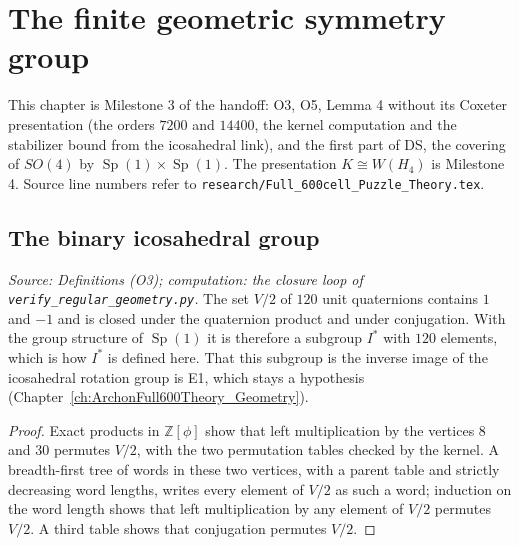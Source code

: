 \chapter{The finite geometric symmetry group}
\label{ch:ArchonFull600Theory_Symmetry}

This chapter is Milestone 3 of the handoff: O3, O5, Lemma 4 without its
Coxeter presentation (the orders \(7200\) and \(14400\), the kernel
computation and the stabilizer bound from the icosahedral link), and the
first part of DS, the covering of \(SO(4)\) by
\(\operatorname{Sp}(1)\times\operatorname{Sp}(1)\). The presentation
\(K\cong W(H_4)\) is Milestone 4. Source line numbers refer to
\texttt{research/Full\_600cell\_Puzzle\_Theory.tex}.

\section{The binary icosahedral group}

\begin{theorem}
  \label{thm:binary-icosahedral}
  \leanok
  \textit{Source: Definitions (O3); computation: the closure loop of
  \texttt{verify\_regular\_geometry.py}.}
  The set \(V/2\) of \(120\) unit quaternions contains \(1\) and \(-1\) and
  is closed under the quaternion product and under conjugation. With the
  group structure of \(\operatorname{Sp}(1)\) it is therefore a subgroup
  \(I^*\) with \(120\) elements, which is how \(I^*\) is defined here.
  That this subgroup is the inverse image of the icosahedral rotation
  group is E1, which stays a hypothesis
  (Chapter~\ref{ch:ArchonFull600Theory_Geometry}).
\end{theorem}
\begin{proof}
  \leanok
  Exact products in \(\mathbb Z[\phi]\) show that left multiplication by
  the vertices \(8\) and \(30\) permutes \(V/2\), with the two permutation
  tables checked by the kernel. A breadth-first tree of words in these two
  vertices, with a parent table and strictly decreasing word lengths,
  writes every element of \(V/2\) as such a word; induction on the word
  length shows that left multiplication by any element of \(V/2\) permutes
  \(V/2\). A third table shows that conjugation permutes \(V/2\).
\end{proof}

